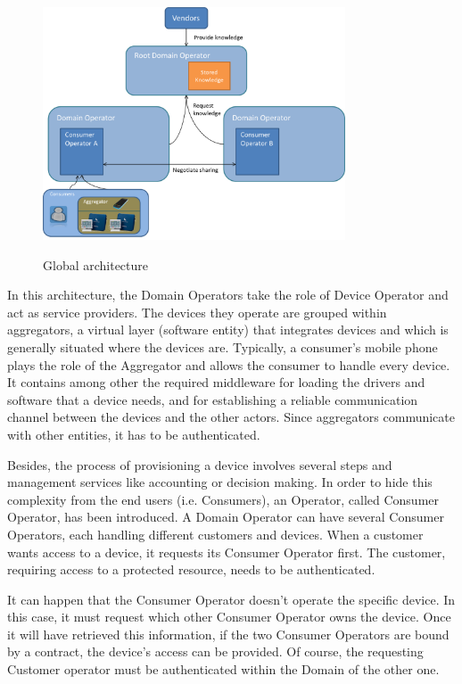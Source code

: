 \begin{figure}[!ht]
	\centering
	\includegraphics[width=0.8\textwidth]{images/design.png}\\
	\caption{Global architecture}
	\label{fig:concept__architecture}
\end{figure}

In this architecture, the Domain Operators take the role of Device Operator and act as service providers. The devices they operate are grouped within aggregators, a virtual layer (software entity) that integrates devices and which is generally situated where the devices are. Typically, a consumer's mobile phone plays the role of the Aggregator and allows the consumer to handle every device. It contains among other the required middleware for loading the drivers and software that a device needs, and for establishing a reliable communication channel between the devices and the other actors. Since aggregators communicate with other entities, it has to be authenticated.

Besides, the process of provisioning a device involves several steps and management services like accounting or decision making. In order to hide this complexity from the end users (i.e. Consumers), an Operator, called Consumer Operator, has been introduced. A Domain Operator can have several Consumer Operators, each handling different customers and devices. When a customer wants access to a device, it requests its Consumer Operator first. The customer, requiring access to a protected resource, needs to be authenticated. 

It can happen that the Consumer Operator doesn't operate the specific device. In this case, it must request which other Consumer Operator owns the device. Once it will have retrieved this information, if the two Consumer Operators are bound by a contract, the device's access can be provided. Of course, the requesting Customer operator must be authenticated within the Domain of the other one.


